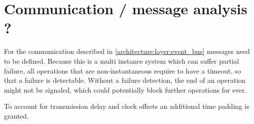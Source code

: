 \section{Communication / message analysis ?}

For the communication described in \autoref{architecture:layer:event_bus} messages need to be defined.
Because this is a multi instance system which can suffer partial failure, all operations that are non-instantaneous require to have a timeout, so that a failure is detectable.
Without a failure detection, the end of an operation might not be signaled, which could potentially block further operations for ever.

To account for transmission delay and clock offsets an additional time padding is granted. 




